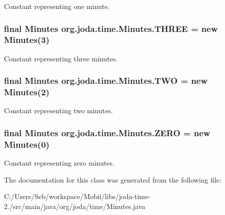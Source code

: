 Constant representing one minute. \hypertarget{classorg_1_1joda_1_1time_1_1_minutes_a3fffa667e953272075c94ae0934177ba}{
\subsubsection[{T\-H\-R\-E\-E}]{\setlength{\rightskip}{0pt plus 5cm}final {\bf Minutes} org.\-joda.\-time.\-Minutes.\-T\-H\-R\-E\-E = new {\bf Minutes}(3)\hspace{0.3cm}{\ttfamily [static]}}}\label{classorg_1_1joda_1_1time_1_1_minutes_a3fffa667e953272075c94ae0934177ba}
Constant representing three minutes. \hypertarget{classorg_1_1joda_1_1time_1_1_minutes_a82f7ec804e600b795adb609686816c6b}{
\subsubsection[{T\-W\-O}]{\setlength{\rightskip}{0pt plus 5cm}final {\bf Minutes} org.\-joda.\-time.\-Minutes.\-T\-W\-O = new {\bf Minutes}(2)\hspace{0.3cm}{\ttfamily [static]}}}\label{classorg_1_1joda_1_1time_1_1_minutes_a82f7ec804e600b795adb609686816c6b}
Constant representing two minutes. \hypertarget{classorg_1_1joda_1_1time_1_1_minutes_a22de49cd88d138dc39faeebe27559c86}{
\subsubsection[{Z\-E\-R\-O}]{\setlength{\rightskip}{0pt plus 5cm}final {\bf Minutes} org.\-joda.\-time.\-Minutes.\-Z\-E\-R\-O = new {\bf Minutes}(0)\hspace{0.3cm}{\ttfamily [static]}}}\label{classorg_1_1joda_1_1time_1_1_minutes_a22de49cd88d138dc39faeebe27559c86}
Constant representing zero minutes. 

The documentation for this class was generated from the following file\-:\begin{DoxyCompactItemize}
\item 
C\-:/\-Users/\-Seb/workspace/\-Mobii/libs/joda-\/time-\/2./src/main/java/org/joda/time/Minutes.\-java\end{DoxyCompactItemize}
